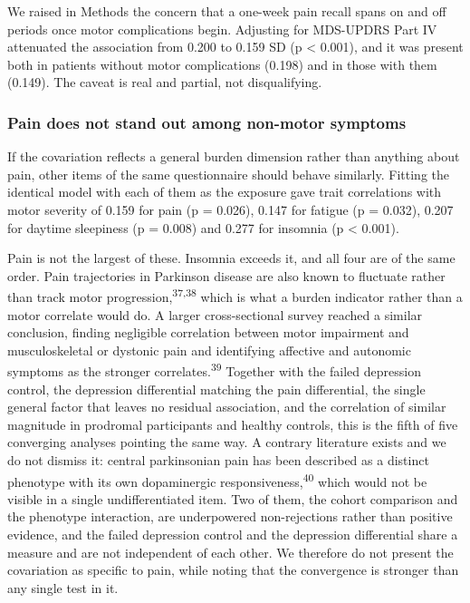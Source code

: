 \documentclass[
  english,
  12pt,
]{article}
\begin{document}
We raised in Methods the concern that a one-week pain recall spans on and off periods once motor complications begin. Adjusting for MDS-UPDRS Part IV attenuated the association from 0.200 to 0.159 SD (p \textless{} 0.001), and it was present both in patients without motor complications (0.198) and in those with them (0.149). The caveat is real and partial, not disqualifying.

\subsubsection{Pain does not stand out among non-motor symptoms}\label{pain-does-not-stand-out-among-non-motor-symptoms}

If the covariation reflects a general burden dimension rather than anything about pain, other items of the same questionnaire should behave similarly. Fitting the identical model with each of them as the exposure gave trait correlations with motor severity of 0.159 for pain (p = 0.026), 0.147 for fatigue (p = 0.032), 0.207 for daytime sleepiness (p = 0.008) and 0.277 for insomnia (p \textless{} 0.001).

Pain is not the largest of these. Insomnia exceeds it, and all four are of the same order. Pain trajectories in Parkinson disease are also known to fluctuate rather than track motor progression,\textsuperscript{37,38} which is what a burden indicator rather than a motor correlate would do. A larger cross-sectional survey reached a similar conclusion, finding negligible correlation between motor impairment and musculoskeletal or dystonic pain and identifying affective and autonomic symptoms as the stronger correlates.\textsuperscript{39} Together with the failed depression control, the depression differential matching the pain differential, the single general factor that leaves no residual association, and the correlation of similar magnitude in prodromal participants and healthy controls, this is the fifth of five converging analyses pointing the same way. A contrary literature exists and we do not dismiss it: central parkinsonian pain has been described as a distinct phenotype with its own dopaminergic responsiveness,\textsuperscript{40} which would not be visible in a single undifferentiated item. Two of them, the cohort comparison and the phenotype interaction, are underpowered non-rejections rather than positive evidence, and the failed depression control and the depression differential share a measure and are not independent of each other. We therefore do not present the covariation as specific to pain, while noting that the convergence is stronger than any single test in it.
\end{document}
